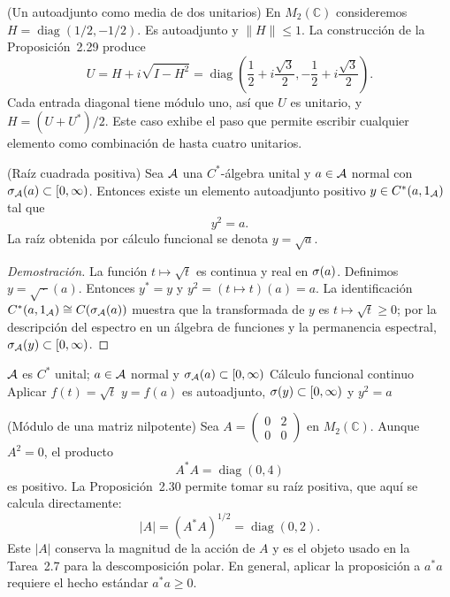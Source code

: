 \begin{cthejemplo}{(Un autoadjunto como media de dos unitarios)}
En $M_2(\mathbb C)$ consideremos
$H=\operatorname{diag}(1/2,-1/2)$.
Es autoadjunto y $\|H\|\le1$. La construcción de la
Proposición~2.29 produce
\[
 U=H+i\sqrt{I-H^2}
 =\operatorname{diag}\!\left(
 \frac12+i\frac{\sqrt3}{2},
 -\frac12+i\frac{\sqrt3}{2}\right).
\]
Cada entrada diagonal tiene módulo uno, así que $U$ es unitario, y
$H=(U+U^*)/2$. Este caso exhibe el paso que permite escribir
cualquier elemento como combinación de hasta cuatro unitarios.
\end{cthejemplo}

\begin{cthproposicion}{(Raíz cuadrada positiva)}
Sea $\mathcal A$ una $C^*$-álgebra unital y $a\in\mathcal A$ normal con
$\sigma_\mathcal A(a)\subset[0,\infty)$. Entonces
existe un elemento autoadjunto positivo
$y\in C^*(a,1_\mathcal A)$ tal que
\[
 y^2=a.
\]
La raíz obtenida por cálculo funcional se denota $y=\sqrt a$.
\end{cthproposicion}

\begin{proof}[Demostración]
La función $t\mapsto\sqrt t$ es continua y real en $\sigma(a)$. Definimos
$y=\sqrt{\,\cdot\,}(a)$. Entonces $y^*=y$ y $y^2=(t\mapsto t)(a)=a$.
La identificación
$C^*(a,1_\mathcal A)\cong C(\sigma_\mathcal A(a))$ muestra que la transformada de $y$ es
$t\mapsto\sqrt t\ge0$; por la descripción del espectro en un álgebra de funciones
y la permanencia espectral, $\sigma_\mathcal A(y)\subset[0,\infty)$.
\end{proof}

\proofdiagram
{$\mathcal A$ es $C^*$ unital; $a\in\mathcal A$ normal y $\sigma_\mathcal A(a)\subset[0,\infty)$}
{Cálculo funcional continuo}
{Aplicar $f(t)=\sqrt t$}
{$y=f(a)$ es autoadjunto, $\sigma(y)\subset[0,\infty)$ y $y^2=a$}

\begin{cthejemplo}{(Módulo de una matriz nilpotente)}
Sea $A=\begin{pmatrix}0&2\\0&0\end{pmatrix}$ en $M_2(\mathbb C)$.
Aunque $A^2=0$, el producto
\[
 A^*A=\operatorname{diag}(0,4)
\]
es positivo. La Proposición~2.30 permite tomar su raíz positiva, que aquí
se calcula directamente:
\[
 |A|=(A^*A)^{1/2}=\operatorname{diag}(0,2).
\]
Este $|A|$ conserva la magnitud de la acción de $A$ y es el objeto usado
en la Tarea~2.7 para la descomposición polar. En general, aplicar
la proposición a $a^*a$ requiere el hecho estándar $a^*a\ge0$.
\end{cthejemplo}

